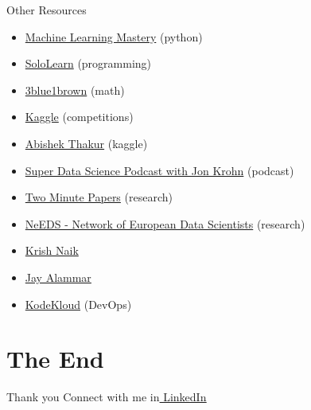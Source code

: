 \documentclass[compress,brown]{beamer}
\begin{document}
\begin{frame}{Other Resources}
\begin{itemize}
	\item \href{https://machinelearningmastery.com/}{Machine Learning Mastery} (python)   		\item \href{https://www.sololearn.com/home}{SoloLearn} (programming)
	\item \href{https://www.youtube.com/c/3blue1brown}{3blue1brown} (math)
	\item \href{https://www.kaggle.com/}{Kaggle} (competitions)
	\item \href{https://www.youtube.com/c/AbhishekThakurAbhi}{Abishek Thakur} (kaggle) 
	\item \href{https://www.youtube.com/c/SuperDataSciencePodcastwithJonKrohn}{Super Data Science Podcast with Jon Krohn} (podcast)
	\item \href{https://www.youtube.com/c/K\%C3\%A1rolyZsolnai}{Two Minute Papers} (research)
	\item \href{https://www.youtube.com/c/NeEDSNetworkofEuropeanDataScientists}{NeEDS - Network of European Data Scientists} (research)
	\item \href{https://www.youtube.com/user/krishnaik06}{Krish Naik}
	\item \href{https://www.youtube.com/channel/UCmOwsoHty5PrmE-3QhUBfPQ}{Jay Alammar}
	\item \href{https://www.youtube.com/c/KodeKloud}{KodeKloud} (DevOps)
\end{itemize}
\end{frame}

\section{The End}
	\begin{frame}{Thank you}
	\vspace{-0.3cm}	
	\center 
	Connect with me in\href{https://www.linkedin.com/in/vitali-avagyan-a1566234/}{ \underline{LinkedIn}}  
	
	
\end{frame}
\end{document}

